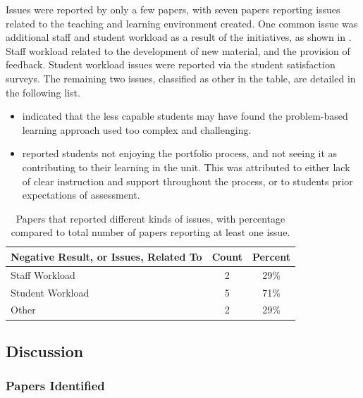 Issues were reported by only a few papers, with seven papers reporting issues related to the teaching and learning environment created. One common issue was additional staff and student workload as a result of the initiatives, as shown in . Staff workload related to the development of new material, and the provision of feedback. Student workload issues were reported via the student satisfaction surveys. The remaining two issues, classified as other in the table, are detailed in the following list.

\begin{itemize}[noitemsep,nolistsep]
	\item \citet{Lin:2004} indicated that the less capable students may have found the problem-based learning approach used too complex and challenging.
	\item \citet{Tang:1999} reported students not enjoying the portfolio process, and not seeing it as contributing to their learning in the unit. This was attributed to either lack of clear instruction and support throughout the process, or to students prior expectations of assessment.
\end{itemize}

\begin{table}[htbp]
	\centering
	\caption{Papers that reported different kinds of issues, with percentage compared to total number of papers reporting at least one issue.}
	\label{tbl:neg_results}
	\footnotesize
    \begin{tabular}{l|c|c}
     \textbf{Negative Result, or Issues, Related To} & \textbf{Count} & \textbf{Percent} \\ \hline
	Staff Workload	& 2	& 29\% \\
	Student Workload	& 5	& 71\% \\
	Other	& 2	& 29\% \\
    \end{tabular}
\end{table}



\clearpage
\subsection{Discussion} %
\label{sub:discussion}


\subsubsection{Papers Identified} %
\label{ssub:geographic_location}

